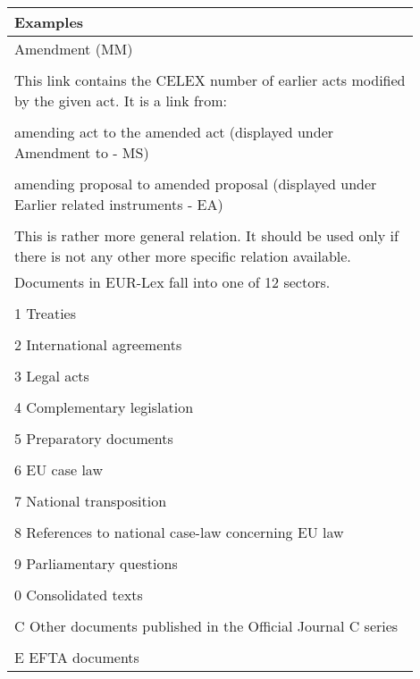 \begin{itemize}
    \begin{tabular}{|p{0.9\linewidth}|}
        \hline
        \textbf{Examples} \\ \hline
        Amendment (MM)
        \\ \\
        This link contains the CELEX number of earlier acts modified by the given act. It is a link from:
        \\ \\
        amending act to the amended act (displayed under Amendment to - MS)
        \\ \\
        amending proposal to amended proposal (displayed under Earlier related instruments - EA)
        \\ \\
        This is rather more general relation. It should be used only if there is not any other more specific relation available.     \\ \hline
        Documents in EUR-Lex fall into one of 12 sectors.
        \\ \\
        1 Treaties
        \\ \\
        2 International agreements
        \\ \\
        3 Legal acts
        \\ \\
        4 Complementary legislation
        \\ \\
        5 Preparatory documents
        \\ \\
        6 EU case law
        \\ \\
        7 National transposition
        \\ \\
        8 References to national case-law concerning EU law
        \\ \\
        9 Parliamentary questions
        \\ \\
        0 Consolidated texts
            \\ \\
        C Other documents published in the Official Journal C series
            \\ \\
        E EFTA documents      \\ \hline
    \end{tabular}


\end{itemize}
